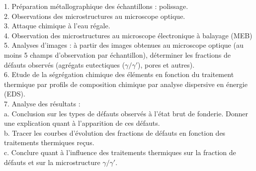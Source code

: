 1. Préparation métallographique des échantillons : polissage.\\
2. Observations des microstructures au microscope optique.\\
3. Attaque chimique à l’eau régale.\\
4. Observation des microstructures au microscope électronique à balayage (MEB)\\
5. Analyses d’images : à partir des images obtenues au microscope optique (au moins 5 champs d’observation par échantillon), déterminer les fractions de défauts observés (agrégats
eutectiques ($\gamma / \gamma'$), pores et autres).\\
6. Etude de la ségrégation chimique des éléments en fonction du traitement thermique par
profils de composition chimique par analyse dispersive en énergie (EDS).\\
7. Analyse des résultats :\\
a. Conclusion sur les types de défauts observés à l’état brut de fonderie. Donner une explication quant à l’apparition de ces défauts.\\
b. Tracer les courbes d’évolution des fractions de défauts en fonction des traitements thermiques reçus.\\
c. Conclure quant à l’influence des traitements thermiques sur la fraction de défauts et sur la microstructure $\gamma / \gamma'$. \\
\newpage